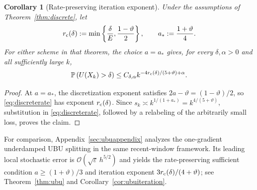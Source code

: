 \documentclass[11pt]{article}
\newtheorem{corollary}[theorem]{Corollary}
\theoremstyle{definition}
\newcommand{\eps}{\varepsilon}
\begin{document}
\begin{corollary}[Rate-preserving iteration exponent]
\label{cor:iterationgain}
Under the assumptions of Theorem~\ref{thm:discrete}, let
\[
 r_{\rm c}(\delta):=\min\left\{\frac\delta E,
                    \frac{1-\vartheta}{2}\right\},
 \qquad a_*:=\frac{1+\vartheta}{4}.
\]
For either scheme in that theorem, the choice $a=a_*$ gives, for every
$\delta,\alpha>0$ and all sufficiently large $k$,
\[
 \mathbb P\left(U(X_k)>\delta\right)
 \leq C_{\delta,\alpha}
 k^{-4r_{\rm c}(\delta)/(5+\vartheta)+\alpha}.
\]
\end{corollary}
\begin{proof}
At $a=a_*$, the discretization exponent satisfies
$2a-\vartheta=(1-\vartheta)/2$, so \eqref{eq:discreterate} has exponent
$r_{\rm c}(\delta)$. Since
$s_k\asymp k^{1/(1+a_*)}=k^{4/(5+\vartheta)}$, substitution in
\eqref{eq:discreterate}, followed by a relabeling of the arbitrarily small
loss, proves the claim.
\end{proof}

For comparison, Appendix~\ref{sec:ubuappendix} analyzes the one-gradient
underdamped UBU splitting in the same recent-window framework. Its leading
local stochastic error is $\mathcal{O}(\sqrt\eps\,h^{5/2})$ and yields the
rate-preserving sufficient condition $a\geq(1+\vartheta)/3$ and iteration
exponent $3r_{\rm c}(\delta)/(4+\vartheta)$; see
Theorem~\ref{thm:ubu} and Corollary~\ref{cor:ubuiteration}.
\end{document}
